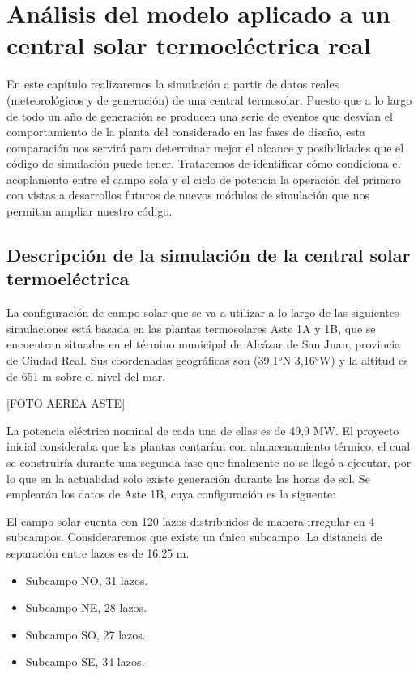 \chapter{Análisis del modelo aplicado a un central solar termoeléctrica real}
\label{analisis-central}

En este capítulo realizaremos la simulación a partir de datos reales (meteorológicos y de generación) de una central termosolar. Puesto que a lo largo de todo un año de generación se producen una serie de eventos que desvían el comportamiento de la planta del considerado en las fases de diseño, esta comparación nos servirá para determinar mejor el alcance y posibilidades que el código de simulación puede tener. Trataremos de identificar cómo condiciona el acoplamento entre el campo sola y el ciclo de potencia la operación del primero con vistas a desarrollos futuros de nuevos módulos de simulación que nos permitan ampliar nuestro código. 

\section{Descripción de la simulación de la central solar termoeléctrica}
\label{descripcion-central}

La configuración de campo solar que se va a utilizar a lo largo de las siguientes simulaciones está basada en las plantas termosolares Aste 1A y 1B, que se encuentran situadas en el término municipal de Alcázar de San Juan, provincia de Ciudad Real. Sus coordenadas geográficas son (39,1°N 3,16°W) y la altitud es de 651 m sobre el nivel del mar.

[FOTO AEREA ASTE]

La potencia eléctrica nominal de cada una de ellas es de 49,9 MW. El proyecto inicial consideraba que las plantas contarían con almacenamiento térmico, el cual se construiría durante una segunda fase que finalmente no se llegó a ejecutar, por lo que en la actualidad solo existe generación durante las horas de sol. Se emplearán los datos de Aste 1B, cuya configuración es la siguente:

El campo solar cuenta con 120 lazos distribuidos de manera irregular en 4 subcampos. Consideraremos que existe un único subcampo. La  distancia de separación entre lazos es de 16,25 m. 

\begin{itemize}[itemsep=2pt,parsep=2pt]
\item
  Subcampo NO, 31 lazos.
\item
  Subcampo NE, 28 lazos.
\item
  Subcampo SO, 27 lazos.
\item
  Subcampo SE, 34 lazos.
\end{itemize}

